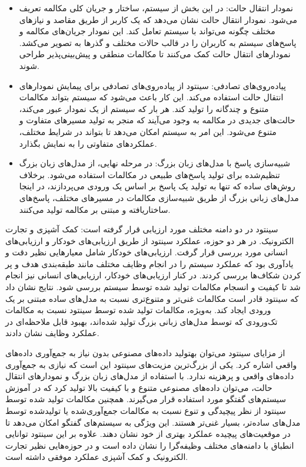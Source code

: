 \begin{enumerate}
\begin{itemize}
\item
نمودار انتقال حالت: در این بخش از سیستم، ساختار و جریان کلی مکالمه تعریف می‌شود. نمودار انتقال حالت نشان می‌دهد که یک کاربر از طریق مقاصد و نیازهای مختلف چگونه می‌تواند با سیستم تعامل کند. این نمودار جریان‌های مکالمه و پاسخ‌های سیستم به کاربران را در قالب حالات مختلف و گذرها به تصویر می‌کشد. نمودارهای انتقال حالت کمک می‌کنند تا مکالمات منطقی و پیش‌بینی‌پذیر طراحی شوند.
\item
پیاده‌روی‌های تصادفی: سینتود از پیاده‌روی‌های تصادفی برای پیمایش نمودارهای انتقال حالت استفاده می‌کند. این کار باعث می‌شود که سیستم بتواند مکالمات متنوع و چندگانه را تولید کند. هر بار که سیستم از یک نمودار عبور می‌کند، حالت‌های جدیدی در مکالمه به وجود می‌آیند که منجر به تولید مسیرهای متفاوت و متنوع می‌شود. این امر به سیستم امکان می‌دهد تا بتواند در شرایط مختلف، عملکردهای متفاوتی را به نمایش بگذارد.
\item
شبیه‌سازی پاسخ با مدل‌های زبان بزرگ: در مرحله نهایی، از مدل‌های زبان بزرگ تنظیم‌شده برای تولید پاسخ‌های طبیعی در مکالمات استفاده می‌شود. برخلاف روش‌های ساده که تنها به تولید یک پاسخ بر اساس یک ورودی می‌پردازند، در اینجا مدل‌های زبانی بزرگ از طریق شبیه‌سازی مکالمات در مسیرهای مختلف، پاسخ‌های ساختاریافته و مبتنی بر مکالمه تولید می‌کنند.
\end{itemize}

سینتود در دو دامنه مختلف مورد ارزیابی قرار گرفته است: کمک آشپزی و تجارت الکترونیک. در هر دو حوزه، عملکرد سینتود از طریق ارزیابی‌های خودکار و ارزیابی‌های انسانی مورد بررسی قرار گرفت. ارزیابی‌های خودکار شامل معیارهایی نظیر دقت و یادآوری بود که عملکرد سیستم را در انجام وظایف مختلف مانند طبقه‌بندی هدف و پر کردن شکاف‌ها بررسی کردند.
\newline
در کنار ارزیابی‌های خودکار، ارزیابی‌های انسانی نیز انجام شد تا کیفیت و انسجام مکالمات تولید شده توسط سیستم بررسی شود. نتایج نشان داد که سینتود قادر است مکالمات غنی‌تر و متنوع‌تری نسبت به مدل‌های ساده مبتنی بر یک ورودی ایجاد کند. به‌ویژه، مکالمات تولید شده توسط سینتود نسبت به مکالمات تک‌ورودی که توسط مدل‌های زبانی بزرگ تولید شده‌اند، بهبود قابل ملاحظه‌ای در عملکرد وظایف نشان دادند.

از مزایای سینتود می‌توان بهتولید داده‌های مصنوعی بدون نیاز به جمع‌آوری داده‌های واقعی اشاره کرد. 
یکی از بزرگ‌ترین مزیت‌های سینتود این است که نیازی به جمع‌آوری داده‌های واقعی و پرهزینه ندارد. با استفاده از مدل‌های زبان بزرگ و نمودارهای انتقال حالت، می‌توان داده‌های مصنوعی متنوع و با کیفیت بالا تولید کرد که در آموزش سیستم‌های گفتگو مورد استفاده قرار می‌گیرند.
\newline
همچنین مکالمات تولید شده توسط سینتود از نظر پیچیدگی و تنوع نسبت به مکالمات جمع‌آوری‌شده یا تولید‌شده توسط مدل‌های ساده‌تر، بسیار غنی‌تر هستند. این ویژگی به سیستم‌های گفتگو امکان می‌دهد تا در موقعیت‌های پیچیده عملکرد بهتری از خود نشان دهند.
علاوه بر این سینتود توانایی انطباق با دامنه‌های مختلف وظیفه‌گرا را نشان داده است و در حوزه‌هایی نظیر تجارت الکترونیک و کمک آشپزی عملکرد موفقی داشته است.


\end{enumerate}
